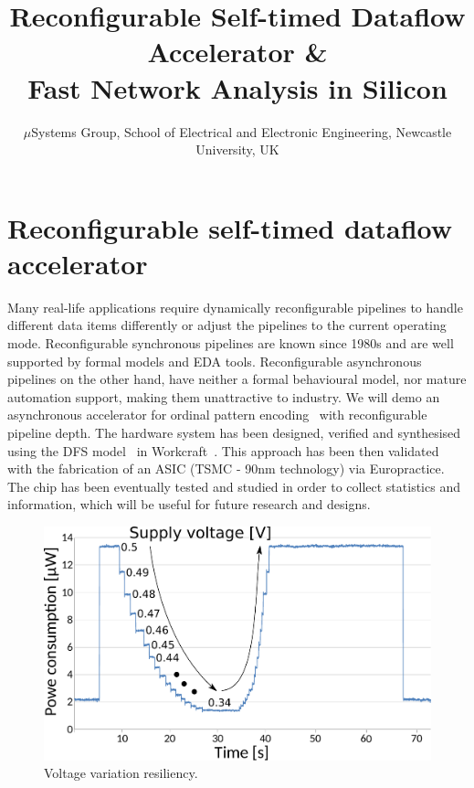 \documentclass[conference]{IEEEtran}
\begin{document}
\title{Reconfigurable Self-timed Dataflow Accelerator \&\\Fast Network Analysis in Silicon}

\author{$\mu$Systems Group, School of Electrical and Electronic Engineering, Newcastle University, UK}

\maketitle


\IEEEpeerreviewmaketitle

\section*{Reconfigurable self-timed dataflow accelerator}
Many real-life applications require dynamically
reconfigurable pipelines to handle different data items differently or adjust
the pipelines to the current operating mode. Reconfigurable synchronous
pipelines are known since 1980s and are well
supported by formal models and EDA tools. Reconfigurable asynchronous
pipelines on the other hand, have neither a formal behavioural model, nor
mature automation support, making them unattractive to industry.
We will demo an asynchronous accelerator for ordinal pattern encoding~\cite{OPE} with
reconfigurable pipeline depth. The hardware system has been designed, verified and synthesised
using the DFS model~\cite{DFS} in Workcraft~\cite{workcraft_web}. This approach has been
then validated with the fabrication of an ASIC (TSMC - 90nm technology) via
Europractice. The chip has been eventually tested and studied in order to collect statistics
and information, which will be useful for future research and designs.

\begin{figure}[ht!]
\begin{center}
	\includegraphics[width=\linewidth]{FIG/voltage-var.pdf}
	\caption{Voltage variation resiliency.}
	\label{fig:voltage-var}
\end{center}
\vspace{-5mm}
\end{figure}
\end{document}
